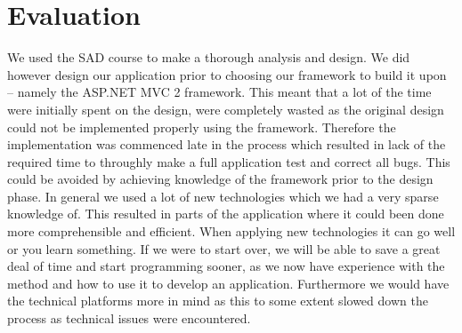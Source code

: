\chapter{Evaluation}
\label{chap:discussion}
We used the SAD course to make a thorough analysis and design.
We did however design our application prior to choosing our framework to build it upon -- namely the ASP.NET MVC 2 framework.
This meant that a lot of the time were initially spent on the design, were completely wasted as the original design could not be implemented properly using the framework.
Therefore the implementation was commenced late in the process which resulted in lack of the required time to throughly make a full application test and correct all bugs.
This could be avoided by achieving knowledge of the framework prior to the design phase. 
In general we used a lot of new technologies which we had a very sparse knowledge of. This resulted in parts of the application where it could been done more comprehensible and efficient.
When applying new technologies it can go well or you learn something.
If we were to start over, we will be able to save a great deal of time and start programming sooner, as we now have experience with the \ooad{} method and how to use it to develop an application. Furthermore we would have the technical platforms more in mind as this to some extent slowed down the process as technical issues were encountered.

